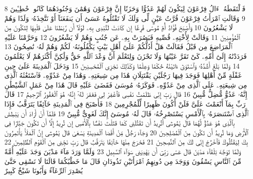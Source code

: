 {\tiny\colorbox{cl_aya}{8}} فَٱلْتَقَطَهُۥٓ ءَالُ فِرْعَوْنَ لِيَكُونَ لَهُمْ عَدُوًّا وَحَزَنًا إِنَّ فِرْعَوْنَ وَهَٰمَٰنَ وَجُنُودَهُمَا كَانُوا۟ خَٰطِـِٔينَ
{\tiny\colorbox{cl_aya}{9}} وَقَالَتِ ٱمْرَأَتُ فِرْعَوْنَ قُرَّتُ عَيْنٍ لِّى وَلَكَ لَا تَقْتُلُوهُ عَسَىٰٓ أَن يَنفَعَنَآ أَوْ نَتَّخِذَهُۥ وَلَدًا وَهُمْ لَا يَشْعُرُونَ
{\tiny\colorbox{cl_aya}{10}} وَأَصْبَحَ فُؤَادُ أُمِّ مُوسَىٰ فَٰرِغًا إِن كَادَتْ لَتُبْدِى بِهِۦ لَوْلَآ أَن رَّبَطْنَا عَلَىٰ قَلْبِهَا لِتَكُونَ مِنَ ٱلْمُؤْمِنِينَ
{\tiny\colorbox{cl_aya}{11}} وَقَالَتْ لِأُخْتِهِۦ قُصِّيهِ فَبَصُرَتْ بِهِۦ عَن جُنُبٍ وَهُمْ لَا يَشْعُرُونَ
{\tiny\colorbox{cl_aya}{12}} وَحَرَّمْنَا عَلَيْهِ ٱلْمَرَاضِعَ مِن قَبْلُ فَقَالَتْ هَلْ أَدُلُّكُمْ عَلَىٰٓ أَهْلِ بَيْتٍ يَكْفُلُونَهُۥ لَكُمْ وَهُمْ لَهُۥ نَٰصِحُونَ
{\tiny\colorbox{cl_aya}{13}} فَرَدَدْنَٰهُ إِلَىٰٓ أُمِّهِۦ كَىْ تَقَرَّ عَيْنُهَا وَلَا تَحْزَنَ وَلِتَعْلَمَ أَنَّ وَعْدَ ٱللَّهِ حَقٌّ وَلَٰكِنَّ أَكْثَرَهُمْ لَا يَعْلَمُونَ
{\tiny\colorbox{cl_aya}{14}} وَلَمَّا بَلَغَ أَشُدَّهُۥ وَٱسْتَوَىٰٓ ءَاتَيْنَٰهُ حُكْمًا وَعِلْمًا وَكَذَٰلِكَ نَجْزِى ٱلْمُحْسِنِينَ
{\tiny\colorbox{cl_aya}{15}} وَدَخَلَ ٱلْمَدِينَةَ عَلَىٰ حِينِ غَفْلَةٍ مِّنْ أَهْلِهَا فَوَجَدَ فِيهَا رَجُلَيْنِ يَقْتَتِلَانِ هَٰذَا مِن شِيعَتِهِۦ وَهَٰذَا مِنْ عَدُوِّهِۦ فَٱسْتَغَٰثَهُ ٱلَّذِى مِن شِيعَتِهِۦ عَلَى ٱلَّذِى مِنْ عَدُوِّهِۦ فَوَكَزَهُۥ مُوسَىٰ فَقَضَىٰ عَلَيْهِ قَالَ هَٰذَا مِنْ عَمَلِ ٱلشَّيْطَٰنِ إِنَّهُۥ عَدُوٌّ مُّضِلٌّ مُّبِينٌ
{\tiny\colorbox{cl_aya}{16}} قَالَ رَبِّ إِنِّى ظَلَمْتُ نَفْسِى فَٱغْفِرْ لِى فَغَفَرَ لَهُۥٓ إِنَّهُۥ هُوَ ٱلْغَفُورُ ٱلرَّحِيمُ
{\tiny\colorbox{cl_aya}{17}} قَالَ رَبِّ بِمَآ أَنْعَمْتَ عَلَىَّ فَلَنْ أَكُونَ ظَهِيرًا لِّلْمُجْرِمِينَ
{\tiny\colorbox{cl_aya}{18}} فَأَصْبَحَ فِى ٱلْمَدِينَةِ خَآئِفًا يَتَرَقَّبُ فَإِذَا ٱلَّذِى ٱسْتَنصَرَهُۥ بِٱلْأَمْسِ يَسْتَصْرِخُهُۥ قَالَ لَهُۥ مُوسَىٰٓ إِنَّكَ لَغَوِىٌّ مُّبِينٌ
{\tiny\colorbox{cl_aya}{19}} فَلَمَّآ أَنْ أَرَادَ أَن يَبْطِشَ بِٱلَّذِى هُوَ عَدُوٌّ لَّهُمَا قَالَ يَٰمُوسَىٰٓ أَتُرِيدُ أَن تَقْتُلَنِى كَمَا قَتَلْتَ نَفْسًۢا بِٱلْأَمْسِ إِن تُرِيدُ إِلَّآ أَن تَكُونَ جَبَّارًا فِى ٱلْأَرْضِ وَمَا تُرِيدُ أَن تَكُونَ مِنَ ٱلْمُصْلِحِينَ
{\tiny\colorbox{cl_aya}{20}} وَجَآءَ رَجُلٌ مِّنْ أَقْصَا ٱلْمَدِينَةِ يَسْعَىٰ قَالَ يَٰمُوسَىٰٓ إِنَّ ٱلْمَلَأَ يَأْتَمِرُونَ بِكَ لِيَقْتُلُوكَ فَٱخْرُجْ إِنِّى لَكَ مِنَ ٱلنَّٰصِحِينَ
{\tiny\colorbox{cl_aya}{21}} فَخَرَجَ مِنْهَا خَآئِفًا يَتَرَقَّبُ قَالَ رَبِّ نَجِّنِى مِنَ ٱلْقَوْمِ ٱلظَّٰلِمِينَ
{\tiny\colorbox{cl_aya}{22}} وَلَمَّا تَوَجَّهَ تِلْقَآءَ مَدْيَنَ قَالَ عَسَىٰ رَبِّىٓ أَن يَهْدِيَنِى سَوَآءَ ٱلسَّبِيلِ
{\tiny\colorbox{cl_aya}{23}} وَلَمَّا وَرَدَ مَآءَ مَدْيَنَ وَجَدَ عَلَيْهِ أُمَّةً مِّنَ ٱلنَّاسِ يَسْقُونَ وَوَجَدَ مِن دُونِهِمُ ٱمْرَأَتَيْنِ تَذُودَانِ قَالَ مَا خَطْبُكُمَا قَالَتَا لَا نَسْقِى حَتَّىٰ يُصْدِرَ ٱلرِّعَآءُ وَأَبُونَا شَيْخٌ كَبِيرٌ
